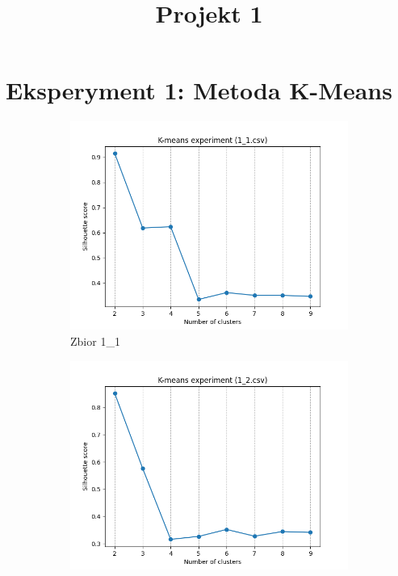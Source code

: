\documentclass[12pt]{article}
\title{Projekt 1}
\begin{document}
\maketitle

\section{Eksperyment 1: Metoda K-Means}
\vspace{-1em}
\begin{figure}[H]
    \centering
    \begin{subfigure}[b]{0.3\textwidth}
        \includegraphics[width=\linewidth]{img/exp_1/kmeans/1_1_scores.png}
        \caption{Zbior 1\_1}
    \end{subfigure}
    \hfill
    \begin{subfigure}[b]{0.3\textwidth}
        \includegraphics[width=\linewidth]{img/exp_1/kmeans/1_2_scores.png}

\end{subfigure}
\end{figure}
\end{document}
